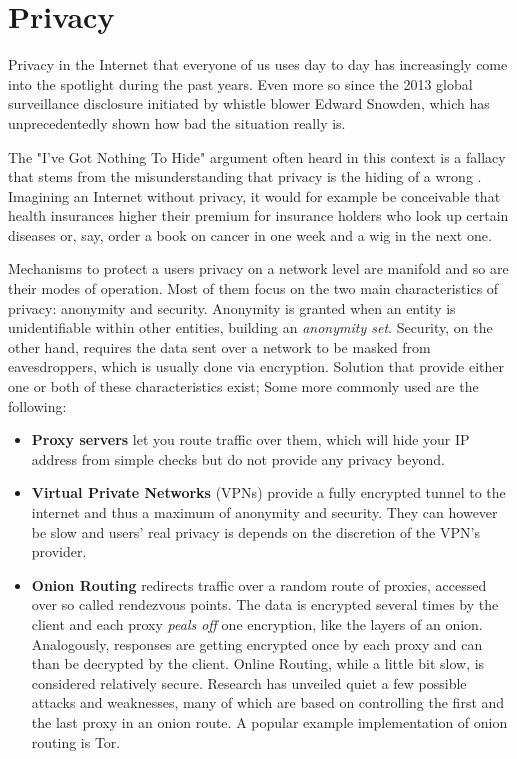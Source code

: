 \documentclass{acm_proc_article-sp}
\begin{document}
\section{Privacy}
\label{sec:priv}
Privacy in the Internet that everyone of us uses day to day has increasingly come into the spotlight during the past years. Even more so since the 2013 global surveillance disclosure initiated by whistle blower Edward Snowden, which has unprecedentedly shown how bad the situation really is.

The "I've Got Nothing To Hide" argument often heard in this context is a fallacy that stems from the misunderstanding that privacy is the hiding of a wrong \cite{solove}. Imagining an Internet without privacy, it would for example be conceivable that health insurances higher their premium for insurance holders who look up certain diseases or, say, order a book on cancer in one week and a wig in the next one.

Mechanisms to protect a users privacy on a network level are manifold and so are their modes of operation. Most of them focus on the two main characteristics of privacy: anonymity and security. Anonymity is granted when an entity is unidentifiable within other entities, building an \emph{anonymity set}. Security, on the other hand, requires the data sent over a network to be masked from eavesdroppers, which is usually done via encryption. Solution that provide either one or both of these characteristics exist; Some more commonly used are the following:
\begin{itemize}
\item \textbf{Proxy servers} let you route traffic over them, which will hide your IP address from simple checks but do not provide any privacy beyond.
\item \textbf{Virtual Private Networks} (VPNs) provide a fully encrypted tunnel to the internet and thus a maximum of anonymity and security. They can however be slow and users' real privacy is depends on the discretion of the VPN's provider.
\item \textbf{Onion Routing} redirects traffic over a random route of proxies, accessed over so called rendezvous points. The data is encrypted several times by the client and each proxy \emph{peals off} one encryption, like the layers of an onion. Analogously, responses are getting encrypted once by each proxy and can than be decrypted by the client. Online Routing, while a little bit slow, is considered relatively secure. Research has unveiled quiet a few possible attacks and weaknesses, many of which are based on controlling the first and the last proxy in an onion route. A popular example implementation of onion routing is Tor.
\end{itemize}
\end{document}
